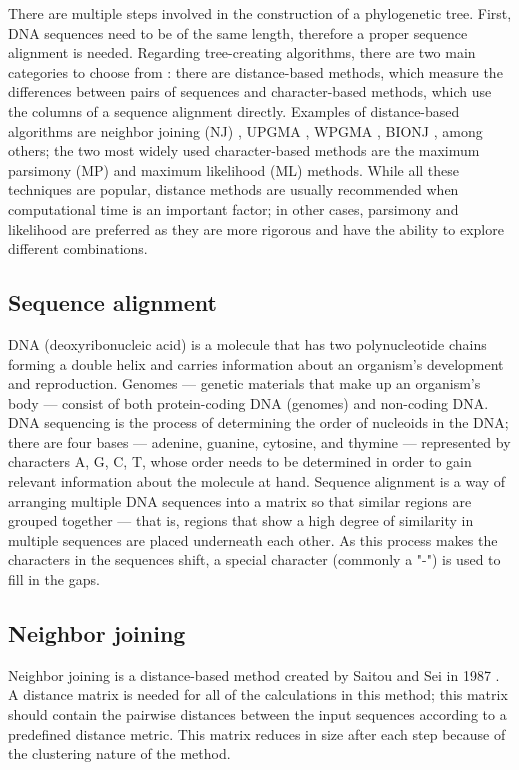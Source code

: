 \documentclass[11pt,twocolumn]{article}
\begin{document}
There are multiple steps involved in the construction of a phylogenetic tree. First, DNA sequences need to be of the same length, therefore a proper sequence alignment is needed. Regarding tree-creating algorithms, there are two main categories to choose from \cite{DeBruyn2013}: there are distance-based methods, which measure the differences between pairs of sequences and character-based methods, which use the columns of a sequence alignment directly. Examples of distance-based algorithms are neighbor joining (NJ) \cite{1987}, UPGMA \cite{sokal58}, WPGMA \cite{sokal58}, BIONJ \cite{Gascuel1997}, among others; the two most widely used character-based methods are the maximum parsimony (MP) and maximum likelihood (ML) methods. While all these techniques are popular, distance methods are usually recommended when computational time is an important factor; in other cases, parsimony and likelihood are preferred as they are more rigorous and have the ability to explore different combinations.

\subsection{Sequence alignment}

DNA (deoxyribonucleic acid) is a molecule that has two polynucleotide chains forming a double helix and carries information about an organism's development and reproduction. Genomes — genetic materials that make up an organism's body — consist of both protein-coding DNA (genomes) and non-coding DNA. DNA sequencing is the process of determining the order of nucleoids in the DNA; there are four bases — adenine, guanine, cytosine, and thymine — represented by characters A, G, C, T, whose order needs to be determined in order to gain relevant information about the molecule at hand. Sequence alignment is a way of arranging multiple DNA sequences into a matrix so that similar regions are grouped together — that is, regions that show a high degree of similarity in multiple sequences are placed underneath each other. As this process makes the characters in the sequences shift, a special character (commonly a "-") is used to fill in the gaps.

\subsection{Neighbor joining}

Neighbor joining is a distance-based method created by Saitou and Sei in 1987 \cite{1987}. A distance matrix is needed for all of the calculations in this method; this matrix should contain the pairwise distances between the input sequences according to a predefined distance metric. This matrix reduces in size after each step because of the clustering nature of the method.
\end{document}

